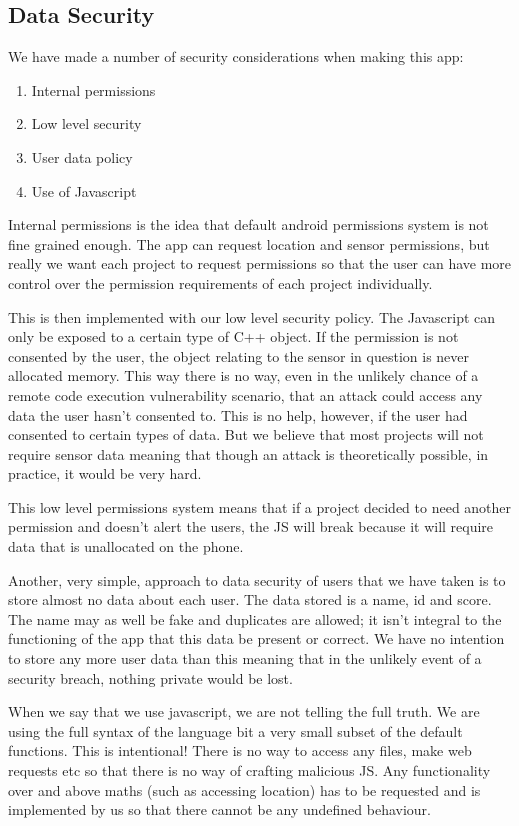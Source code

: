 \documentclass{article}
\begin{document}
\subsection{Data Security}
We have made a number of security considerations when making this app:
\begin{enumerate}
  \item{Internal permissions}
	\item{Low level security}
  \item{User data policy}
  \item{Use of Javascript}
\end{enumerate}
Internal permissions is the idea that default android permissions system is not fine grained enough. The app can request location and sensor
permissions, but really we want each project to request permissions so that the user can have more control over the permission requirements of
each project individually.

This is then implemented with our low level security policy. The Javascript can only be exposed to a certain type of C++ object.
If the permission is not consented by the user, the object relating to the sensor in question is never allocated memory. This way
there is no way, even in the unlikely chance of a remote code execution vulnerability scenario, that an attack could access any data
the user hasn't consented to. This is no help, however, if the user had consented to certain types of data. But we believe that most projects
will not require sensor data meaning that though an attack is theoretically possible, in practice, it would be very hard.

This low level permissions system means that if a project decided to need another permission and doesn't alert the users, the JS will break
because it will require data that is unallocated on the phone.

Another, very simple, approach to data security of users that we have taken is to store almost no data about each user. The data stored is
a name, id and score. The name may as well be fake and duplicates are allowed; it isn't integral to the functioning of the app that this data
be present or correct. We have no intention to store any more user data than this meaning  that in the unlikely event of a security breach,
nothing private would be lost.

When we say that we use javascript, we are not telling the full truth. We are using the full syntax of the language bit a very small
subset of the default functions. This is intentional! There is no way to access any files, make web requests etc so that there is
no way of crafting malicious JS. Any functionality over and above maths (such as accessing location) has to be requested and is implemented
by us so that there cannot be any undefined behaviour.
\end{document}
